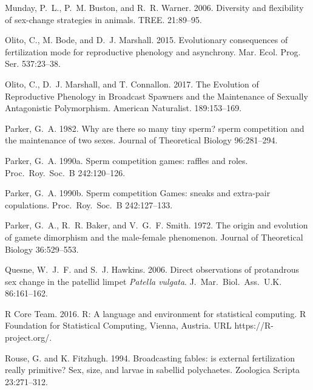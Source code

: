 \documentclass{article}
\begin{document}
\begin{thebibliography}{}
Munday, P.~L., P.~M. Buston, and R.~R. Warner. 2006.
\newblock Diversity and flexibility of sex-change strategies in animals.
\newblock TREE. 21:89--95.

Olito, C., M. Bode, and D.~J. Marshall. 2015.
\newblock Evolutionary consequences of fertilization mode for reproductive phenology and asynchrony.
\newblock Mar. Ecol. Prog. Ser. 537:23--38.

Olito, C., D.~J. Marshall, and T. Connallon. 2017.
\newblock The Evolution of Reproductive Phenology in Broadcast Spawners and the Maintenance of Sexually Antagonistic Polymorphism.
\newblock American Naturalist. 189:153--169.

Parker, G.~A. 1982.
\newblock Why are there so many tiny sperm? sperm competition and the maintenance of two sexes.
\newblock Journal of Theoretical Biology 96:281--294.

Parker, G.~A. 1990a.
\newblock Sperm competition games: raffles and roles.
\newblock Proc.~Roy.~Soc.~B 242:120--126.

Parker, G.~A. 1990b.
\newblock Sperm competition Games: sneaks and extra-pair copulations.
\newblock Proc.~Roy.~Soc.~B 242:127--133.

Parker, G.~A., R.~R. Baker, and V.~G.~F. Smith. 1972.
\newblock The origin and evolution of gamete dimorphism and the male-female phenomenon.
\newblock Journal of Theoretical Biology 36:529--553.

Quesne, W.~J.~F. and S.~J. Hawkins. 2006.
\newblock Direct observations of protandrous sex change in the patellid limpet \textit{Patella vulgata}.
\newblock J.~Mar.~Biol.~Ass.~U.K. 86:161--162.

R Core Team. 2016.
\newblock R: A language and environment for statistical computing. 
\newblock R Foundation for Statistical Computing, Vienna, Austria. URL https://R-project.org/.

Rouse, G. and K. Fitzhugh. 1994.
\newblock Broadcasting fables: is external fertilization really primitive? Sex, size, and larvae in sabellid polychaetes.
\newblock Zoologica Scripta 23:271--312.


\end{thebibliography}
\end{document}
